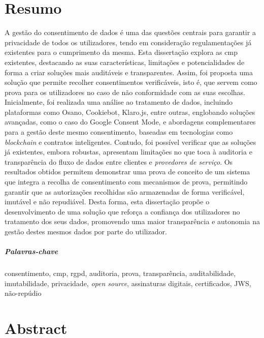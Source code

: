 \chapter*{Resumo}


A gestão do consentimento de dados é uma das questões centrais para garantir a privacidade de todos os utilizadores, tendo em consideração regulamentações já existentes para o cumprimento da mesma. Esta dissertação explora as \acrfull{cmp} existentes, destacando as suas características, limitações e potencialidades de forma a criar soluções mais auditáveis e transparentes. 
Assim, foi proposta uma solução que permite recolher consentimentos verificáveis, isto é, que servem como prova para os utilizadores no caso de não conformidade com as suas escolhas. Inicialmente, foi realizada uma análise ao tratamento de dados, incluindo plataformas como Osano, Cookiebot, Klaro.js, entre outras, englobando soluções avançadas, como o caso do Google Consent Mode, e abordagens complementares para a gestão deste mesmo consentimento, baseadas em tecnologias como \textit{blockchain} e contratos inteligentes.
Contudo, foi possível verificar que as soluções já existentes, embora robustas, apresentam limitações no que toca à auditoria e transparência do fluxo de dados entre clientes e \textit{provedores de serviço}. Os resultados obtidos permitem demonstrar uma prova de conceito de um sistema que integra a recolha de consentimento com mecanismos de prova, permitindo garantir que as autorizações recolhidas são armazenadas de forma verificável, imutável e não repudiável. 
Desta forma, esta dissertação propõe o desenvolvimento de uma solução que reforça a confiança dos utilizadores no tratamento dos seus dados, promovendo uma maior transparência e autonomia na gestão destes mesmos dados por parte do utilizador.

\paragraph{Palavras-chave} consentimento, \acrshort{cmp}, \acrshort{rgpd}, auditoria, prova, transparência, auditabilidade, imutabilidade, privacidade, \textit{open source}, assinaturas digitais, certificados, JWS, não-repúdio


\cleardoublepage

\chapter*{Abstract}

